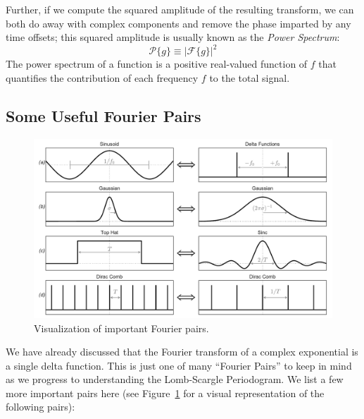 \documentclass[preprint]{aastex}
\newcommand{\Fig}[1]{Figure~\ref{fig:#1}}
\newcommand{\figlabel}[1]{\label{fig:#1}}
\begin{document}
Further, if we compute the squared amplitude of the resulting transform, we can both do away with complex components and remove the phase imparted by any time offsets; this squared amplitude is usually known as the {\it Power Spectrum}:
\begin{equation}
  \mathcal{P}\{g\} \equiv \left|\mathcal{F}\{g\}\right|^2
\end{equation}
The power spectrum of a function is a positive real-valued function of $f$ that quantifies the contribution of each frequency $f$ to the total signal.

\subsection{Some Useful Fourier Pairs}

\begin{figure}[ht]
\centering
\includegraphics[width=\textwidth]{fig03_Fourier_pairs}
\caption{Visualization of important Fourier pairs.\figlabel{fourier_pairs}}
\end{figure}

We have already discussed that the Fourier transform of a complex exponential is a single delta function.
This is just one of many ``Fourier Pairs'' to keep in mind as we progress to understanding the Lomb-Scargle Periodogram.
We list a few more important pairs here (see \Fig{fourier_pairs} for a visual representation of the following pairs):
\end{document}
